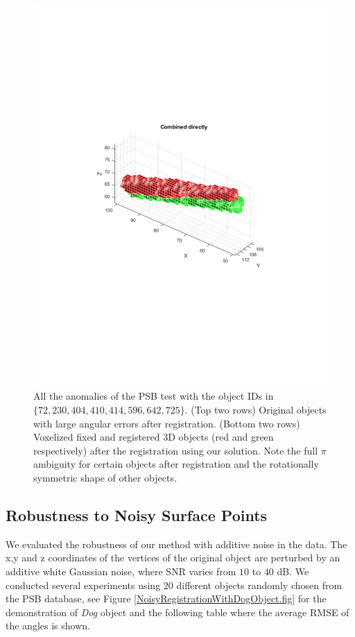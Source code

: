 \documentclass{UCF_ETD}
\begin{document}
\begin{figure}[H]
\begin{center}
\includegraphics[scale=0.35]{RobustRegistration/NoiselessAnomaliesResult8}
\caption{All the anomalies of the PSB test with the object IDs in $\{ 72, 230, 404, 410, 414, 596, 642, 725\}$. (Top two rows) Original objects with large angular errors after registration. (Bottom two rows) Voxelized fixed and registered $3$D objects (red and green respectively) after the registration using our solution. Note the full $\pi$ ambiguity for certain objects after registration and the rotationally symmetric shape of other objects. }
\label{PDBAnomalies.fig}
\end{center}
\end{figure}


\subsection{Robustness to Noisy Surface Points}
We evaluated the robustness of our method with additive noise in the data.  The x,y and z coordinates of the vertices of the original object are perturbed by an additive white Gaussian noise, where SNR varies from $10$ to $40$ dB. We conducted several experiments using $20$ different objects randomly chosen from the PSB database, see Figure \ref{NoisyRegistrationWithDogObject.fig} for the demonstration of \emph{Dog} object and the following table where the average RMSE of the angles is shown. 
\end{document}
